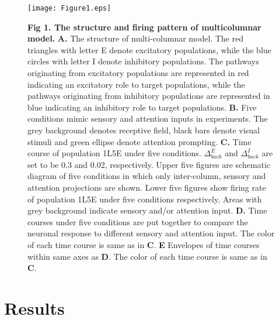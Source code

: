 \documentclass[10pt,letterpaper]{article}
\begin{document}
\begin{figure}[!h]
\begin{adjustwidth}{-2in}{0.3in} %
\centering
\texttt{[image: Figure1.eps]}
\begin{flushleft} {\bf Fig 1. The structure and firing pattern of multicolumnar model.}
{\bf A.} The structure of multi-columnar model. The red triangles with letter E denote excitatory populations, while the blue circles with letter I denote inhibitory populations. The pathways originating from excitatory populations are represented in red indicating an excitatory role to target populations, while the pathways originating from inhibitory populations are represented in blue indicating an inhibitory role to target populations. \textbf{B.} Five conditions mimic sensory and attention inputs in experiments. The grey background denotes receptive field, black bars denote visual stimuli and green ellipse denote attention prompting. \textbf{C.} Time course of population 1L5E under five conditions. $\Delta_{back}^{E}$ and $\Delta_{back}^{I}$ are set to be 0.3 and 0.02, respectively. Upper five figures are schematic diagram of five conditions in which only inter-column, sensory and attention projections are shown. Lower five figures show firing rate of population 1L5E under five conditions respectively. Areas with grey background indicate sensory and/or attention input. \textbf{D.} Time courses under five conditions are put together to compare the neuronal response to different sensory and attention input. The color of each time course is same as in \textbf{C}. \textbf{E} Envelopes of time courses within same axes as \textbf{D}. The color of each time course is same as in \textbf{C}.
\end{flushleft}
\hypertarget{fig:fig1}{}
\end{adjustwidth}
\end{figure}

\section*{Results}
\end{document}
